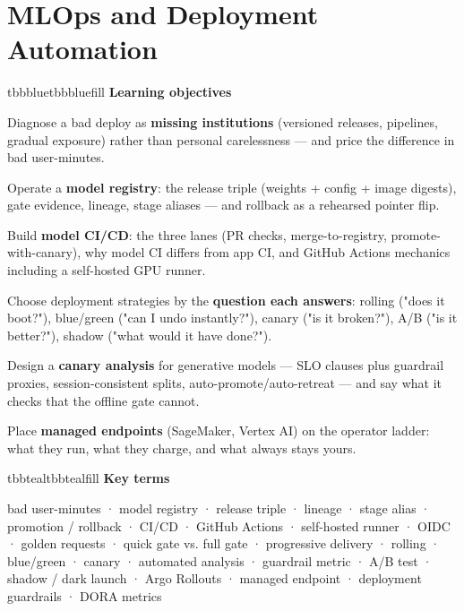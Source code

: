 \setcounter{chapter}{12}
\chapter{MLOps and Deployment Automation}

\begin{calloutbox}{tbbblue}{tbbbluefill}
{\normalsize\bfseries\color{tbbblue}Learning objectives}\par\vspace{3pt}
\begin{tbbitemize}
  \item Diagnose a bad deploy as \textbf{missing institutions} (versioned releases, pipelines, gradual exposure) rather than personal carelessness — and price the difference in bad user-minutes.
  \item Operate a \textbf{model registry}: the release triple (weights + config + image digests), gate evidence, lineage, stage aliases — and rollback as a rehearsed pointer flip.
  \item Build \textbf{model CI/CD}: the three lanes (PR checks, merge-to-registry, promote-with-canary), why model CI differs from app CI, and GitHub Actions mechanics including a self-hosted GPU runner.
  \item Choose deployment strategies by the \textbf{question each answers}: rolling ("does it boot?"), blue/green ("can I undo instantly?"), canary ("is it broken?"), A/B ("is it better?"), shadow ("what would it have done?").
  \item Design a \textbf{canary analysis} for generative models — SLO clauses plus guardrail proxies, session-consistent splits, auto-promote/auto-retreat — and say what it checks that the offline gate cannot.
  \item Place \textbf{managed endpoints} (SageMaker, Vertex AI) on the operator ladder: what they run, what they charge, and what always stays yours.
\end{tbbitemize}
\end{calloutbox}

\vspace{2.5pt}

\begin{calloutbox}{tbbteal}{tbbtealfill}
{\normalsize\bfseries\color{tbbteal}Key terms}\par\vspace{3pt}
bad user-minutes · model registry · release triple · lineage · stage alias · promotion / rollback · CI/CD · GitHub Actions · self-hosted runner · OIDC · golden requests · quick gate vs. full gate · progressive delivery · rolling · blue/green · canary · automated analysis · guardrail metric · A/B test · shadow / dark launch · Argo Rollouts · managed endpoint · deployment guardrails · DORA metrics
\end{calloutbox}

